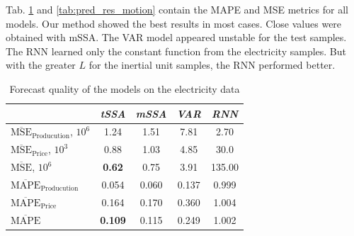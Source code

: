 \documentclass[referee, pdflatex, sn-mathphys-num]{sn-jnl}
\theoremstyle{definition}
\theoremstyle{plain}
\begin{document}
	Tab. \ref{tab:pred_res_electr} and \ref{tab:pred_res_motion} contain the MAPE and MSE metrics for all models. Our method showed the best results in most cases. Close values were obtained with mSSA. The VAR model appeared unstable for the test samples. The RNN learned only the constant function from the electricity samples. But with the greater $ L $ for the inertial unit samples, the RNN performed better.
	
	\def\arraystretch{1.2}
	\begin{table}[h]
		\centering
		\caption{Forecast quality of the models on the electricity data}\label{tab:pred_res_electr}
		\begin{tabular}{|l|c|c|c|c|}
			\hline
			\diagbox[width=3.3cm]{Metric}{Method} & \textit{tSSA}  & \textit{mSSA} & \textit{VAR} & \textit{RNN} \\ \hline
			$ \overline{\text{MSE}}_{\text{Producution}} $, $10^6$ & 1.24           & 1.51          & 7.81         & 2.70         \\ \hline
			$ \overline{\text{MSE}}_{\text{Price}} $, $10^3$      & 0.88           & 1.03          & 4.85         & 30.0         \\ \hline
			$ \overline{\text{MSE}} $, $10^6$             & \textbf{0.62}  & 0.75          & 3.91         & 135.00       \\ \hline
			$ \overline{\text{MAPE}}_{\text{Producution}} $        & 0.054          & 0.060         & 0.137        & 0.999        \\ \hline
			$ \overline{\text{MAPE}}_{\text{Price}} $             & 0.164          & 0.170         & 0.360        & 1.004        \\ \hline
			$ \overline{\text{MAPE}} $                    & \textbf{0.109} & 0.115         & 0.249        & 1.002        \\ \hline
		\end{tabular}
	\end{table}
	
\end{document}
